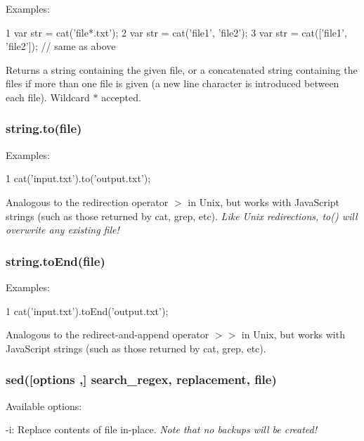 Examples\+:


\begin{DoxyCode}
1 var str = cat('file*.txt');
2 var str = cat('file1', 'file2');
3 var str = cat(['file1', 'file2']); // same as above
\end{DoxyCode}


Returns a string containing the given file, or a concatenated string containing the files if more than one file is given (a new line character is introduced between each file). Wildcard {\ttfamily $\ast$} accepted.

\subsubsection*{\textquotesingle{}string\textquotesingle{}.to(file)}

Examples\+:


\begin{DoxyCode}
1 cat('input.txt').to('output.txt');
\end{DoxyCode}


Analogous to the redirection operator {\ttfamily $>$} in Unix, but works with Java\+Script strings (such as those returned by {\ttfamily cat}, {\ttfamily grep}, etc). {\itshape Like Unix redirections, {\ttfamily to()} will overwrite any existing file!}

\subsubsection*{\textquotesingle{}string\textquotesingle{}.to\+End(file)}

Examples\+:


\begin{DoxyCode}
1 cat('input.txt').toEnd('output.txt');
\end{DoxyCode}


Analogous to the redirect-\/and-\/append operator {\ttfamily $>$$>$} in Unix, but works with Java\+Script strings (such as those returned by {\ttfamily cat}, {\ttfamily grep}, etc).

\subsubsection*{sed(\mbox{[}options ,\mbox{]} search\+\_\+regex, replacement, file)}

Available options\+:


\begin{DoxyItemize}
\item {\ttfamily -\/i}\+: Replace contents of \textquotesingle{}file\textquotesingle{} in-\/place. {\itshape Note that no backups will be created!}
\end{DoxyItemize}

